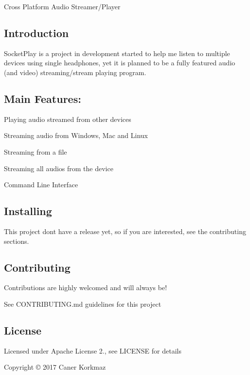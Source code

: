 Cross Platform Audio Streamer/\+Player

\subsection*{Introduction}

Socket\+Play is a project in development started to help me listen to multiple devices using single headphones, yet it is planned to be a fully featured audio (and video) streaming/stream playing program.

\subsection*{Main Features\+:}


\begin{DoxyItemize}
\item Playing audio streamed from other devices
\item Streaming audio from Windows, Mac and Linux
\begin{DoxyItemize}
\item Streaming from a file
\item Streaming all audios from the device
\end{DoxyItemize}
\item Command Line Interface
\end{DoxyItemize}

\subsection*{Installing}

This project don\textquotesingle{}t have a release yet, so if you are interested, see the contributing sections.

\subsection*{Contributing}

Contributions are highly welcomed and will always be!

See C\+O\+N\+T\+R\+I\+B\+U\+T\+I\+N\+G.\+md guidelines for this project

\subsection*{License}

Licensed under Apache License 2., see L\+I\+C\+E\+N\+SE for details

Copyright © 2017 Caner Korkmaz 